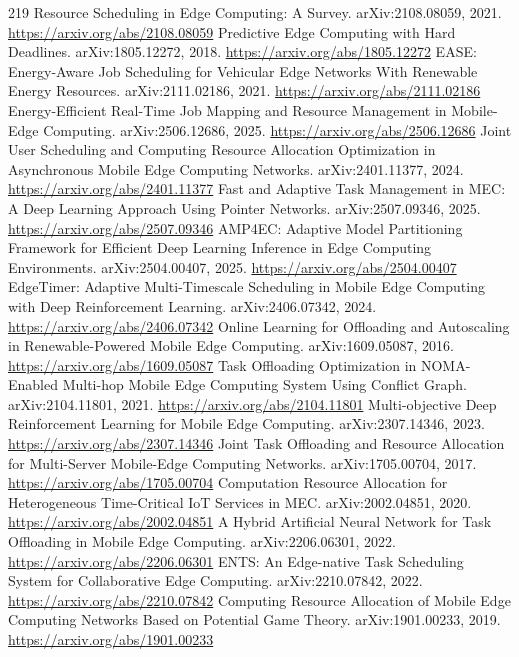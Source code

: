 \documentclass[11pt]{article}
\begin{document}
\begin{thebibliography}{219}
 Resource Scheduling in Edge Computing: A Survey. arXiv:2108.08059, 2021. \url{https://arxiv.org/abs/2108.08059}
 Predictive Edge Computing with Hard Deadlines. arXiv:1805.12272, 2018. \url{https://arxiv.org/abs/1805.12272}
 EASE: Energy-Aware Job Scheduling for Vehicular Edge Networks With Renewable Energy Resources. arXiv:2111.02186, 2021. \url{https://arxiv.org/abs/2111.02186}
 Energy-Efficient Real-Time Job Mapping and Resource Management in Mobile-Edge Computing. arXiv:2506.12686, 2025. \url{https://arxiv.org/abs/2506.12686}
 Joint User Scheduling and Computing Resource Allocation Optimization in Asynchronous Mobile Edge Computing Networks. arXiv:2401.11377, 2024. \url{https://arxiv.org/abs/2401.11377}
 Fast and Adaptive Task Management in MEC: A Deep Learning Approach Using Pointer Networks. arXiv:2507.09346, 2025. \url{https://arxiv.org/abs/2507.09346}
 AMP4EC: Adaptive Model Partitioning Framework for Efficient Deep Learning Inference in Edge Computing Environments. arXiv:2504.00407, 2025. \url{https://arxiv.org/abs/2504.00407}
 EdgeTimer: Adaptive Multi-Timescale Scheduling in Mobile Edge Computing with Deep Reinforcement Learning. arXiv:2406.07342, 2024. \url{https://arxiv.org/abs/2406.07342}
 Online Learning for Offloading and Autoscaling in Renewable-Powered Mobile Edge Computing. arXiv:1609.05087, 2016. \url{https://arxiv.org/abs/1609.05087}
 Task Offloading Optimization in NOMA-Enabled Multi-hop Mobile Edge Computing System Using Conflict Graph. arXiv:2104.11801, 2021. \url{https://arxiv.org/abs/2104.11801}
 Multi-objective Deep Reinforcement Learning for Mobile Edge Computing. arXiv:2307.14346, 2023. \url{https://arxiv.org/abs/2307.14346}
 Joint Task Offloading and Resource Allocation for Multi-Server Mobile-Edge Computing Networks. arXiv:1705.00704, 2017. \url{https://arxiv.org/abs/1705.00704}
 Computation Resource Allocation for Heterogeneous Time-Critical IoT Services in MEC. arXiv:2002.04851, 2020. \url{https://arxiv.org/abs/2002.04851}
 A Hybrid Artificial Neural Network for Task Offloading in Mobile Edge Computing. arXiv:2206.06301, 2022. \url{https://arxiv.org/abs/2206.06301}
 ENTS: An Edge-native Task Scheduling System for Collaborative Edge Computing. arXiv:2210.07842, 2022. \url{https://arxiv.org/abs/2210.07842}
 Computing Resource Allocation of Mobile Edge Computing Networks Based on Potential Game Theory. arXiv:1901.00233, 2019. \url{https://arxiv.org/abs/1901.00233}

\end{thebibliography}
\end{document}

